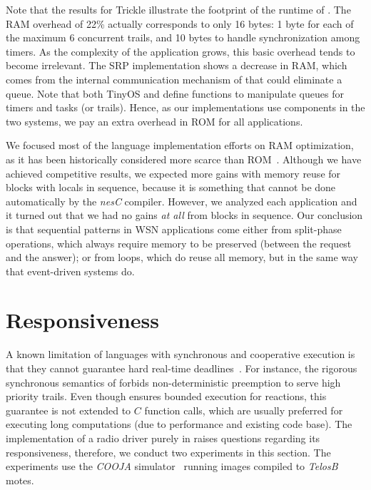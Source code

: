 Note that the results for Trickle illustrate the footprint of the runtime of 
\CEU.
The RAM overhead of 22\% actually corresponds to only 16 bytes: 1 byte for each 
of the maximum 6 concurrent trails, and 10 bytes to handle synchronization 
among timers.
%
As the complexity of the application grows, this basic overhead tends to become 
irrelevant.
%
The SRP implementation shows a decrease in RAM, which comes from the internal 
communication mechanism of \CEU that could eliminate a queue.
%
Note that both TinyOS and \CEU define functions to manipulate queues for timers 
and tasks (or trails).
Hence, as our implementations use components in the two systems, we pay an 
extra overhead in ROM for all applications.

We focused most of the language implementation efforts on RAM optimization, as 
it has been historically considered more scarce than ROM~\cite{wsn.decade}.
Although we have achieved competitive results, we expected more gains with 
memory reuse for blocks with locals in sequence, because it is something that 
cannot be done automatically by the \emph{nesC} compiler.
However, we analyzed each application and it turned out that we had no gains 
\emph{at all} from blocks in sequence.
Our conclusion is that sequential patterns in WSN applications come either from 
split-phase operations, which always require memory to be preserved (between 
the request and the answer);
or from loops, which do reuse all memory, but in the same way that event-driven 
systems do.

\section{Responsiveness}
\label{sec.eval.radio}

A known limitation of languages with synchronous and cooperative execution is 
that they cannot guarantee hard real-time 
deadlines~\cite{wsn.comparison,wsn.tosthreads}.
%
For instance, the rigorous synchronous semantics of \CEU forbids 
non-deterministic preemption to serve high priority trails.
%
Even though \CEU ensures bounded execution for reactions, this guarantee is not 
extended to $C$ function calls, which are usually preferred for executing long 
computations (due to performance and existing code base).
%
%
The implementation of a radio driver purely in \CEU raises questions
regarding its responsiveness, therefore, we conduct two experiments in this 
section.
%
The experiments use the \emph{COOJA} simulator~\cite{wsn.cooja} running images 
compiled to \emph{TelosB} motes.

